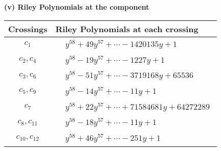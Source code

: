 \documentclass[1p]{elsarticle_modified}
\theoremstyle{definition}
\begin{document}
\flushleft \textbf{(v) Riley Polynomials at the component}\newline \\
\begin{tabular}{m{50pt}|m{274pt}}
Crossings & \hspace{64pt}Riley Polynomials at each crossing \\
\hline $$\begin{aligned}c_{1}\end{aligned}$$&$\begin{aligned}
&y^{58}+49 y^{57}+\cdots-1420135 y+1
\end{aligned}$\\
\hline $$\begin{aligned}c_{2},c_{4}\end{aligned}$$&$\begin{aligned}
&y^{58}-19 y^{57}+\cdots-1227 y+1
\end{aligned}$\\
\hline $$\begin{aligned}c_{3},c_{6}\end{aligned}$$&$\begin{aligned}
&y^{58}-51 y^{57}+\cdots-3719168 y+65536
\end{aligned}$\\
\hline $$\begin{aligned}c_{5},c_{9}\end{aligned}$$&$\begin{aligned}
&y^{58}-14 y^{57}+\cdots-11 y+1
\end{aligned}$\\
\hline $$\begin{aligned}c_{7}\end{aligned}$$&$\begin{aligned}
&y^{58}+22 y^{57}+\cdots+71584681 y+64272289
\end{aligned}$\\
\hline $$\begin{aligned}c_{8},c_{11}\end{aligned}$$&$\begin{aligned}
&y^{58}-18 y^{57}+\cdots-11 y+1
\end{aligned}$\\
\hline $$\begin{aligned}c_{10},c_{12}\end{aligned}$$&$\begin{aligned}
&y^{58}+46 y^{57}+\cdots-251 y+1
\end{aligned}$\\
\hline
\end{tabular}\\~\\
\end{document}
